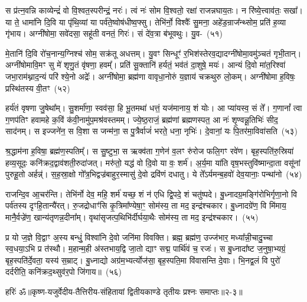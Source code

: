 {\anuvakamend[{ए॒तस्य॑ पय॒स्या॑यां पाति॒ षड्विꣳ॑शतिश्च}]}%

स प्र॑त्न॒वन्नि काव्येन्द्रं॑ वो वि॒श्वत॒स्परीन्द्रं॒ नरः॑। त्वं नः॑ सोम वि॒श्वतो॒ रक्षा॑ राजन्नघाय॒तः। न रि॑ष्ये॒त्त्वाव॑तः॒ सखा᳚। या ते॒ धामा॑नि दि॒वि या पृ॑थि॒व्यां या पर्व॑ते॒ष्वोष॑धीष्व॒फ्सु। तेभि॑र्नो॒ विश्वैः᳚ सु॒मना॒ अहे॑ड॒न्राज᳚न्थ्सोम॒ प्रति॑ ह॒व्या गृ॑भाय। अग्नी॑षोमा॒ सवे॑दसा॒ सहू॑ती वनतं॒ गिरः॑। सं दे॑व॒त्रा ब॑भूवथुः। यु॒व-~(५१)\ip

मे॒तानि॑ दि॒वि रो॑च॒नान्य॒ग्निश्च॑ सोम॒ सक्र॑तू अधत्तम्। यु॒वꣳ सिन्धूꣳ॑ र॒भिश॑स्तेरव॒द्यादग्नी॑\-षोमा॒वमु॑ञ्चतं गृभी॒तान्। अग्नी॑षोमावि॒मꣳ सु मे॑ शृणु॒तं वृ॑षणा॒ हवम्᳚। प्रति॑ सू॒क्तानि॑ हर्यतं॒ भव॑तं दा॒शुषे॒ मयः॑। आन्यं दि॒वो मा॑त॒रिश्वा॑ जभा॒राम॑थ्नाद॒न्यं परि॑ श्ये॒नो अद्रेः᳚। अग्नी॑षोमा॒ ब्रह्म॑णा वावृधा॒नोरुं य॒ज्ञाय॑ चक्रथुरु लो॒कम्। अग्नी॑षोमा ह॒विषः॒ प्रस्थि॑तस्य वी॒तꣳ~(५२)\ip

हर्य॑तं वृषणा जु॒षेथा᳚म्। सु॒शर्मा॑णा॒ स्वव॑सा॒ हि भू॒तमथा॑ धत्तं॒ यज॑मानाय॒ शं योः। आ प्या॑यस्व॒ सं ते᳚। ग॒णानां᳚ त्वा ग॒णप॑तिꣳ हवामहे क॒विं क॑वी॒नामु॑प॒मश्र॑वस्तमम्। ज्ये॒ष्ठ॒राजं॒ ब्रह्म॑णां ब्रह्मणस्पत॒ आ नः॑ शृ॒ण्वन्नू॒तिभिः॑ सीद॒ साद॑नम्। स इज्जने॑न॒ स वि॒शा स जन्म॑ना॒ स पु॒त्रैर्वाजं॑ भरते॒ धना॒ नृभिः॑। दे॒वानां॒ यः पि॒तर॑मा॒विवा॑सति~(५३)\ip

श्र॒द्धाम॑ना ह॒विषा॒ ब्रह्म॑ण॒स्पतिम्᳚। स सु॒ष्टुभा॒ स ऋक्व॑ता ग॒णेन॑ व॒लꣳ रु॑रोज फलि॒गꣳ रवे॑ण। बृह॒स्पति॑रु॒स्रिया॑ हव्य॒सूदः॒ कनि॑क्रद॒द्वाव॑शती॒रुदा॑जत्। मरु॑तो॒ यद्ध॑ वो दि॒वो या वः॒ शर्म॑। अ॒र्य॒मा या॑ति वृष॒भस्तुवि॑ष्मान्दा॒ता वसू॑नां पुरुहू॒तो अर्\mbox{}हन्न्॑। स॒ह॒स्रा॒क्षो गो᳚त्र॒भिद्वज्र॑बाहुर॒स्मासु॑ दे॒वो द्रवि॑णं दधातु। ये ते᳚\-ऽर्यमन्ब॒हवो॑ देव॒यानाः॒ पन्था॑नो~(५४)\ip

राजन्दि॒व आ॒चर॑न्ति। तेभि॑र्नो देव॒ महि॒ शर्म॑ यच्छ॒ शं न॑ एधि द्वि॒पदे॒ शं चतु॑ष्पदे। बु॒ध्नादग्र॒मङ्गि॑रोभिर्गृणा॒नो वि पर्व॑तस्य दृꣳहि॒तान्यै॑रत्। रु॒जद्रोधाꣳ॑सि कृ॒त्रिमा᳚ण्येषा॒ꣳ॒ सोम॑स्य॒ ता मद॒ इन्द्र॑श्चकार। बु॒ध्नादग्रे॑ण॒ वि मि॑माय॒ मानै॒र्वज्रे॑ण॒ खान्य॑तृणन्न॒दीना᳚म्। वृथा॑सृजत्प॒थिभि॑र्दीर्घया॒थैः सोम॑स्य॒ ता मद॒ इन्द्र॑श्चकार।~(५५)\ip

प्र यो ज॒ज्ञे वि॒द्वाꣳ अ॒स्य बन्धुं॒ विश्वा॑नि दे॒वो जनि॑मा विवक्ति। ब्रह्म॒ ब्रह्म॑ण॒ उज्ज॑भार॒ मध्या᳚न्नी॒चादु॒च्चा स्व॒धया॒\-ऽभि प्र त॑स्थौ। म॒हान्म॒ही अ॑स्तभाय॒द्वि जा॒तो द्याꣳ सद्म॒ पार्थि॑वं च॒ रजः॑। स बु॒ध्नादा᳚ष्ट ज॒नुषा॒भ्यग्रं॒ बृह॒स्पति॑र्दे॒वता॒ यस्य॑ स॒म्राट्। बु॒ध्नाद्यो अग्र॑म॒भ्यर्त्योज॑सा॒ बृह॒स्पति॒मा वि॑वासन्ति दे॒वाः। भि॒नद्व॒लं वि पुरो॑ दर्दरीति॒ कनि॑क्रद॒थ्सुव॑र॒पो जि॑गाय॥~(५६)\ip

{\anuvakamend[{यु॒वं वी॒तमा॒ विवा॑सति॒ पन्था॑नो दीर्घया॒थैः सोम॑स्य॒ ता मद॒ इन्द्र॑श्चकार दे॒वा नव॑ च}]}%

{हरिः॑ ॐ}{॥कृष्ण-यजुर्वेदीय-तैत्तिरीय-संहितायां द्वितीयकाण्डे तृतीयः प्रश्नः समाप्तः॥२-३॥}


